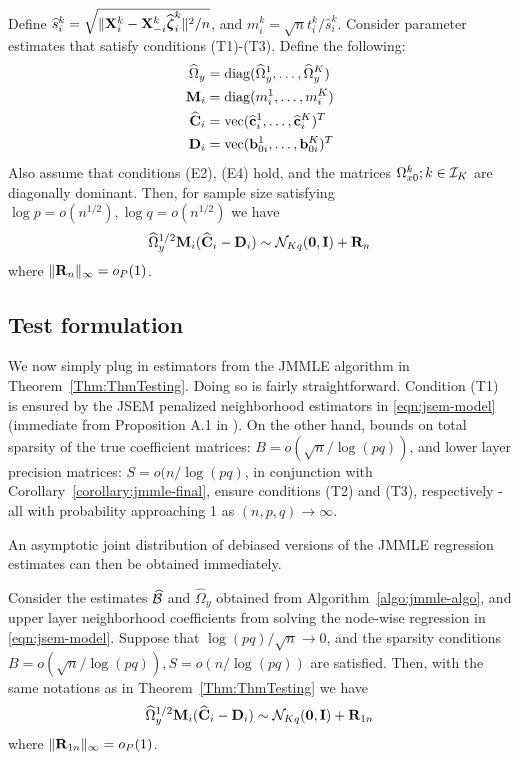 \begin{Theorem}\label{Thm:ThmTesting}
Define $\widehat s_i^k = \sqrt{\| {\mathbf{X}}_i^k - {\mathbf{X}}_{-i}^k \widehat {{\boldsymbol{\zeta}}}_i^k \|^2/n}$, and $m_i^k = \sqrt n t_i^k / \widehat s_i^k$. Consider parameter estimates that satisfy conditions (T1)-(T3). Define the following:
%
\begin{align*}
\widehat \Omega_y &= \operatorname*{diag}(\widehat \Omega_y^1, \ldots, \widehat \Omega_y^K)\\
{\mathbf{M}}_i &= \operatorname*{diag}(m_i^1, \ldots, m_i^K)\\
\widehat {{\mathbf{C}}}_i &= \operatorname*{vec}(\widehat {{\bf{c}}}_i^1, \ldots, \widehat {{\bf{c}}}_i^K)^T\\
{\mathbf{D}}_i &= \operatorname*{vec}({\bf{b}}_{0i}^1, \ldots, {\bf{b}}_{0i}^K)^T\\
\end{align*}
%
Also assume that conditions (E2), (E4) hold, and the matrices $\Omega_{x0}^k; k \in {\cal{I}}_K$ are diagonally
dominant. Then, for sample size satisfying 
$\log p = o(n^{1/2}), \log q = o(n^{1/2})$ we have
%
\begin{align}\label{eqn:ThmTestingEqn}
\widehat \Omega_y^{1/2} {\mathbf{M}}_i (\widehat {{\mathbf{C}}}_i - {\mathbf{D}}_i) \sim
{\cal{N}}_{Kq} ({\bf 0}, {\mathbf{I}}) + {\mathbf{R}}_n
\end{align}
%
where $\| {\mathbf{R}}_n \|_\infty = o_P(1)$.
\end{Theorem}
%

\subsection{Test formulation}
\label{sec:testing-subsec-2}
We now simply plug in estimators from the JMMLE algorithm in Theorem~\ref{Thm:ThmTesting}. Doing so is fairly straightforward. Condition (T1) is ensured by the JSEM penalized neighborhood estimators in \eqref{eqn:jsem-model} (immediate from Proposition A.1 in \cite{MaMichailidis15}). On the other hand, bounds on total sparsity of the true coefficient matrices: $B = o(\sqrt{n} / \log(pq))$, and lower layer precision matrices: $S = o( n/ \log (pq)$, in conjunction with Corollary~\ref{corollary:jmmle-final}, ensure conditions (T2) and (T3), respectively -all with probability approaching 1 as $(n,p,q) \rightarrow \infty$.

An asymptotic joint distribution of debiased versions of the JMMLE regression estimates can then be obtained immediately.
%
\begin{Corollary}\label{corollary:CorTesting}
Consider the estimates $\widehat {{\cal{B}}}$ and $\widehat \Omega_y $ obtained from Algorithm~\ref{algo:jmmle-algo}, and upper layer neighborhood coefficients from solving the node-wise regression in \eqref{eqn:jsem-model}. Suppose that $\log (pq) /\sqrt n \rightarrow 0$, and the sparsity conditions $B = o(\sqrt{n} / \log(pq)), S = o( n / \log(pq))$ are satisfied. Then, with the same notations as in Theorem~\ref{Thm:ThmTesting} we have
%
\begin{align}\label{eqn:CorTestingEqn}
\widehat \Omega_y^{1/2} {\mathbf{M}}_i (\widehat {{\mathbf{C}}}_i - {\mathbf{D}}_i) \sim
{\cal{N}}_{Kq} ({\bf 0}, {\mathbf{I}}) + {\mathbf{R}}_{1n}
\end{align}
%
where $\| {\mathbf{R}}_{1n} \|_\infty = o_P(1)$.
\end{Corollary}

